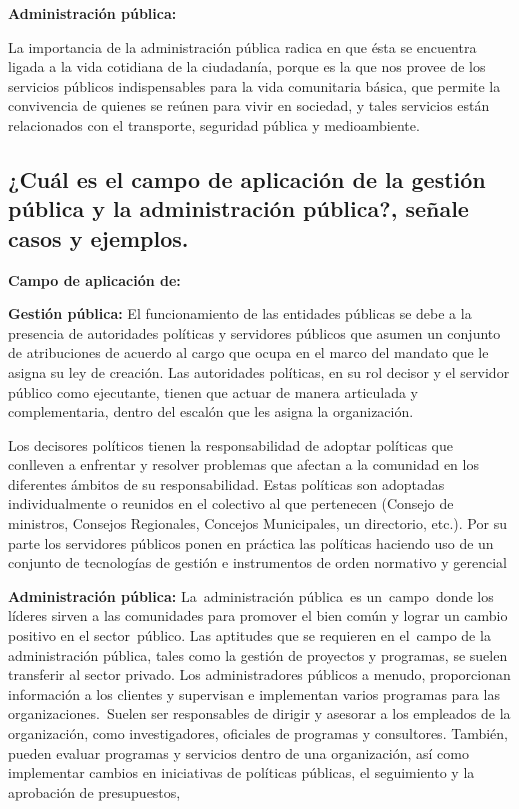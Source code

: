 \documentclass[
  letterpaper,
  DIV=11,
  numbers=noendperiod]{scrartcl}
\begin{document}
\textbf{Administración pública:}

La importancia de la administración pública radica en que ésta se
encuentra ligada a la vida cotidiana de la ciudadanía, porque es la que
nos provee de los servicios públicos indispensables para la vida
comunitaria básica, que permite la convivencia de quienes se reúnen para
vivir en sociedad, y tales servicios están relacionados con el
transporte, seguridad pública y medioambiente.

\hypertarget{cuuxe1l-es-el-campo-de-aplicaciuxf3n-de-la-gestiuxf3n-puxfablica-y-la-administraciuxf3n-puxfablica-seuxf1ale-casos-y-ejemplos.}{%
\subsection{¿Cuál es el campo de aplicación de la gestión pública y la
administración pública?, señale casos y
ejemplos.}\label{cuuxe1l-es-el-campo-de-aplicaciuxf3n-de-la-gestiuxf3n-puxfablica-y-la-administraciuxf3n-puxfablica-seuxf1ale-casos-y-ejemplos.}}

\textbf{Campo de aplicación de:}

\textbf{Gestión pública:} El funcionamiento de las entidades públicas se
debe a la presencia de autoridades políticas y servidores públicos que
asumen un conjunto de atribuciones de acuerdo al cargo que ocupa en el
marco del mandato que le asigna su ley de creación. Las autoridades
políticas, en su rol decisor y el servidor público como ejecutante,
tienen que actuar de manera articulada y complementaria, dentro del
escalón que les asigna la organización.

Los decisores políticos tienen la responsabilidad de adoptar políticas
que conlleven a enfrentar y resolver problemas que afectan a la
comunidad en los diferentes ámbitos de su responsabilidad. Estas
políticas son adoptadas individualmente o reunidos en el colectivo al
que pertenecen (Consejo de ministros, Consejos Regionales, Concejos
Municipales, un directorio, etc.). Por su parte los servidores públicos
ponen en práctica las políticas haciendo uso de un conjunto de
tecnologías de gestión e instrumentos de orden normativo y gerencial

\textbf{Administración pública:} La~administración pública~es
un~campo~donde los líderes sirven a las comunidades para promover el
bien común y lograr un cambio positivo en el sector~público. Las
aptitudes que se requieren en el~campo de la administración pública,
tales como la gestión de proyectos y programas, se suelen transferir al
sector privado. Los administradores públicos a menudo, proporcionan
información a los clientes y supervisan e implementan varios programas
para las organizaciones.~Suelen ser responsables de dirigir y asesorar a
los empleados de la organización, como investigadores, oficiales de
programas y consultores. También, pueden evaluar programas y servicios
dentro de una organización, así como implementar cambios en iniciativas
de políticas públicas, el seguimiento y la aprobación de presupuestos,
\end{document}
